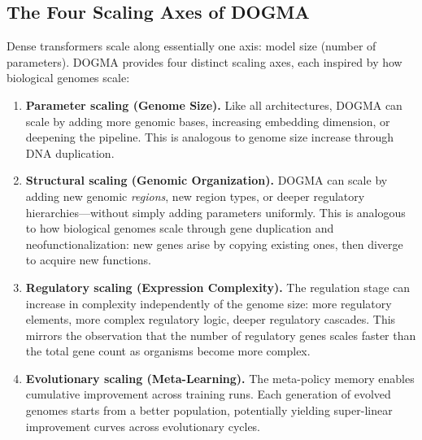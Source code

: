 \subsection{The Four Scaling Axes of DOGMA}

Dense transformers scale along essentially one axis: model size (number of parameters). DOGMA provides four distinct scaling axes, each inspired by how biological genomes scale:

\begin{enumerate}[leftmargin=1.8em]
  \item \textbf{Parameter scaling (Genome Size).} Like all architectures, DOGMA can scale by adding more genomic bases, increasing embedding dimension, or deepening the pipeline. This is analogous to genome size increase through DNA duplication.

  \item \textbf{Structural scaling (Genomic Organization).} DOGMA can scale by adding new genomic \emph{regions}, new region types, or deeper regulatory hierarchies---without simply adding parameters uniformly. This is analogous to how biological genomes scale through gene duplication and neofunctionalization: new genes arise by copying existing ones, then diverge to acquire new functions.

  \item \textbf{Regulatory scaling (Expression Complexity).} The regulation stage can increase in complexity independently of the genome size: more regulatory elements, more complex regulatory logic, deeper regulatory cascades. This mirrors the observation that the number of regulatory genes scales faster than the total gene count as organisms become more complex.

  \item \textbf{Evolutionary scaling (Meta-Learning).} The meta-policy memory enables cumulative improvement across training runs. Each generation of evolved genomes starts from a better population, potentially yielding super-linear improvement curves across evolutionary cycles.
\end{enumerate}

